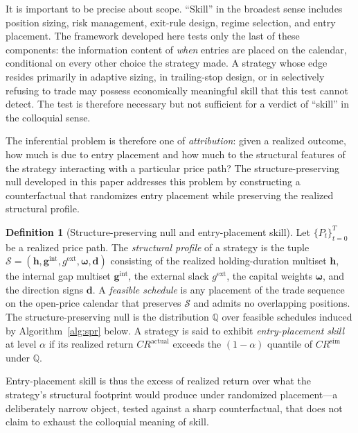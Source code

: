 \documentclass[preprint,12pt]{elsarticle}
\theoremstyle{definition}
\newtheorem{definition}{Definition}
\begin{document}
It is important to be precise about scope. ``Skill'' in the broadest sense includes position sizing, risk management, exit-rule design, regime selection, and entry placement. The framework developed here tests only the last of these components: the information content of \emph{when} entries are placed on the calendar, conditional on every other choice the strategy made. A strategy whose edge resides primarily in adaptive sizing, in trailing-stop design, or in selectively refusing to trade may possess economically meaningful skill that this test cannot detect. The test is therefore necessary but not sufficient for a verdict of ``skill'' in the colloquial sense.

The inferential problem is therefore one of \emph{attribution}: given a realized outcome, how much is due to entry placement and how much to the structural features of the strategy interacting with a particular price path? The structure-preserving null developed in this paper addresses this problem by constructing a counterfactual that randomizes entry placement while preserving the realized structural profile.

\begin{definition}[Structure-preserving null and entry-placement skill]
Let $\{P_t\}_{t=0}^{T}$ be a realized price path. The \emph{structural profile} of a strategy is the tuple $\mathcal{S} = (\mathbf{h}, \mathbf{g}^{\mathrm{int}}, g^{\mathrm{ext}}, \boldsymbol{\omega}, \mathbf{d})$ consisting of the realized holding-duration multiset $\mathbf{h}$, the internal gap multiset $\mathbf{g}^{\mathrm{int}}$, the external slack $g^{\mathrm{ext}}$, the capital weights $\boldsymbol{\omega}$, and the direction signs $\mathbf{d}$. A \emph{feasible schedule} is any placement of the trade sequence on the open-price calendar that preserves $\mathcal{S}$ and admits no overlapping positions. The structure-preserving null is the distribution $\mathbb{Q}$ over feasible schedules induced by Algorithm~\ref{alg:spr} below. A strategy is said to exhibit \emph{entry-placement skill} at level $\alpha$ if its realized return $CR^{\mathrm{actual}}$ exceeds the $(1-\alpha)$ quantile of $CR^{\mathrm{sim}}$ under $\mathbb{Q}$.
\end{definition}

Entry-placement skill is thus the excess of realized return over what the strategy's structural footprint would produce under randomized placement---a deliberately narrow object, tested against a sharp counterfactual, that does not claim to exhaust the colloquial meaning of skill.
\end{document}
